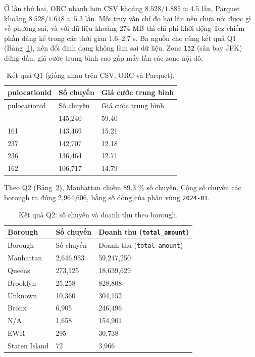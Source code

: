\documentclass[
  12pt,
  a4paper,
]{report}
\begin{document}
Ở lần thứ hai, ORC nhanh hơn CSV khoảng \(8.528/1.885 \approx 4.5\) lần,
Parquet khoảng \(8.528/1.618 \approx 5.3\) lần. Mỗi truy vấn chỉ đo hai
lần nên chưa nói được gì về phương sai, và với dữ liệu khoảng 274 MB thì
chi phí khởi động Tez chiếm phần đáng kể trong các thời gian 1.6--2.7 s.
Ba nguồn cho cùng kết quả Q1 (Bảng~\ref{tbl:l03-q1}), nên đổi định dạng
không làm sai dữ liệu. Zone \texttt{132} (sân bay JFK) đứng đầu, giá
cước trung bình cao gấp mấy lần các zone nội đô.

\begin{longtable}[]{@{}lll@{}}
\caption{\label{tbl:l03-q1}Kết quả Q1 (giống nhau trên CSV, ORC và
Parquet).}\tabularnewline
\toprule\noalign{}
pulocationid & Số chuyến & Giá cước trung bình \\
\midrule\noalign{}
\endfirsthead
\toprule\noalign{}
pulocationid & Số chuyến & Giá cước trung bình \\
\midrule\noalign{}
\endhead
\bottomrule\noalign{}
\endlastfoot
132 & 145,240 & 59.40 \\
161 & 143,469 & 15.21 \\
237 & 142,707 & 12.18 \\
236 & 136,464 & 12.71 \\
162 & 106,717 & 14.79 \\
\end{longtable}

Theo Q2 (Bảng~\ref{tbl:l03-q2}), Manhattan chiếm 89.3 \% số chuyến. Cộng
số chuyến các borough ra đúng 2,964,606, bằng số dòng của phân vùng
\texttt{2024-01}.

\begin{longtable}[]{@{}lll@{}}
\caption{\label{tbl:l03-q2}Kết quả Q2: số chuyến và doanh thu theo
borough.}\tabularnewline
\toprule\noalign{}
Borough & Số chuyến & Doanh thu (\texttt{total\_amount}) \\
\midrule\noalign{}
\endfirsthead
\toprule\noalign{}
Borough & Số chuyến & Doanh thu (\texttt{total\_amount}) \\
\midrule\noalign{}
\endhead
\bottomrule\noalign{}
\endlastfoot
Manhattan & 2,646,933 & 59,247,250 \\
Queens & 273,125 & 18,639,629 \\
Brooklyn & 25,258 & 828,808 \\
Unknown & 10,360 & 304,152 \\
Bronx & 6,905 & 246,496 \\
N/A & 1,658 & 154,901 \\
EWR & 295 & 30,738 \\
Staten Island & 72 & 3,966 \\
\end{longtable}
\end{document}
